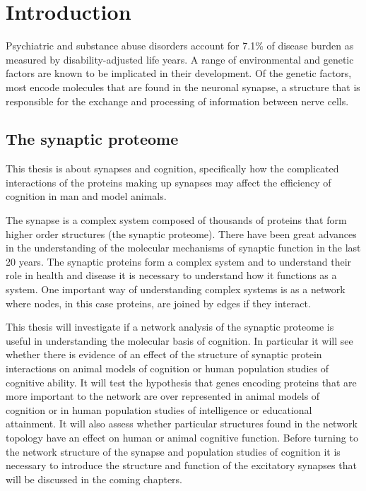 \chapter{Introduction}


Psychiatric and substance abuse disorders account for 7.1\% of disease burden as measured by disability-adjusted life years\cite{murray2015global}.   A range of environmental and genetic factors are known to be implicated in their development. Of the genetic factors, most encode molecules that are found in the neuronal synapse, a structure that is responsible for the exchange and processing of information between nerve cells\cite{grant2012synaptopathies}.

\section{The synaptic proteome}

This thesis is about synapses and cognition, specifically how the complicated interactions of the proteins making up synapses may affect the efficiency of cognition in man and model animals. 

The synapse is a complex system composed of thousands of proteins that form higher order structures (the synaptic proteome)\cite{grant2012synaptopathies}. There have been great advances in the understanding of the molecular mechanisms of synaptic function in the last 20 years\cite{grant2018synaptomic}. The synaptic proteins form a complex system and to understand their role in health and disease it is necessary to understand how it functions as a system.  One important way of understanding complex systems is as a network where nodes, in this case proteins, are joined by edges if they interact. 



This thesis will investigate if a network analysis of the synaptic proteome is useful in understanding the molecular basis of cognition. In particular it will see whether there is evidence of an effect of the structure of synaptic protein interactions on animal models of cognition or human population studies of cognitive ability. It will test the hypothesis that genes encoding proteins that are more important to the network are over represented in animal models of cognition or in human population studies of intelligence or educational attainment. It will also assess whether particular structures found in the network topology have an effect on human or animal cognitive function. Before turning to the network structure of the synapse and population studies of cognition it is necessary to introduce the structure and function of the excitatory synapses that will be discussed in the coming chapters. 

